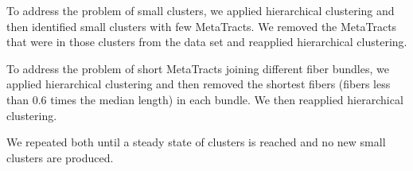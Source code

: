  To address the problem of small clusters, we applied hierarchical clustering and then identified small clusters with few MetaTracts.
 We removed the MetaTracts that were in those clusters from the data set and reapplied hierarchical clustering.

 To address the problem of short MetaTracts joining different fiber bundles, we applied hierarchical clustering and then removed the
shortest fibers (fibers less than 0.6 times the median length) in each bundle. We then reapplied hierarchical clustering.

We repeated both until a steady state of clusters is reached and no new small clusters are produced. 
  
  
  
